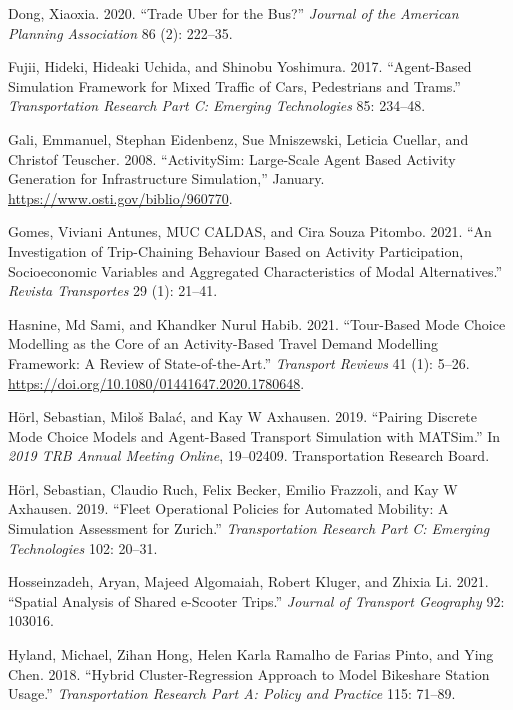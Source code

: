 \documentclass[12pt, oneside, openright]{byuthesis}
\newlength{\cslhangindent}
\newlength{\cslentryspacingunit} %
\newenvironment{CSLReferences}[2] %
 {%
  \setlength{\parindent}{0pt}
  \ifodd #1
  \let\oldpar\par
  \def\par{\hangindent=\cslhangindent\oldpar}
  \fi
  \setlength{\parskip}{#2\cslentryspacingunit}
 }%
 {}
\begin{document}
\begin{CSLReferences}{1}{0}
\leavevmode{}%
Dong, Xiaoxia. 2020. {``Trade Uber for the Bus?''} \emph{Journal of the American Planning Association} 86 (2): 222--35.

\leavevmode{}%
Fujii, Hideki, Hideaki Uchida, and Shinobu Yoshimura. 2017. {``Agent-Based Simulation Framework for Mixed Traffic of Cars, Pedestrians and Trams.''} \emph{Transportation Research Part C: Emerging Technologies} 85: 234--48.

\leavevmode{}%
Gali, Emmanuel, Stephan Eidenbenz, Sue Mniszewski, Leticia Cuellar, and Christof Teuscher. 2008. {``ActivitySim: Large-Scale Agent Based Activity Generation for Infrastructure Simulation,''} January. \url{https://www.osti.gov/biblio/960770}.

\leavevmode{}%
Gomes, Viviani Antunes, MUC CALDAS, and Cira Souza Pitombo. 2021. {``An Investigation of Trip-Chaining Behaviour Based on Activity Participation, Socioeconomic Variables and Aggregated Characteristics of Modal Alternatives.''} \emph{Revista Transportes} 29 (1): 21--41.

\leavevmode{}%
Hasnine, Md Sami, and Khandker Nurul Habib. 2021. {``Tour-Based Mode Choice Modelling as the Core of an Activity-Based Travel Demand Modelling Framework: A Review of State-of-the-Art.''} \emph{Transport Reviews} 41 (1): 5--26. \url{https://doi.org/10.1080/01441647.2020.1780648}.

\leavevmode{}%
Hörl, Sebastian, Miloš Balać, and Kay W Axhausen. 2019. {``Pairing Discrete Mode Choice Models and Agent-Based Transport Simulation with MATSim.''} In \emph{2019 TRB Annual Meeting Online}, 19--02409. Transportation Research Board.

\leavevmode{}%
Hörl, Sebastian, Claudio Ruch, Felix Becker, Emilio Frazzoli, and Kay W Axhausen. 2019. {``Fleet Operational Policies for Automated Mobility: A Simulation Assessment for Zurich.''} \emph{Transportation Research Part C: Emerging Technologies} 102: 20--31.

\leavevmode{}%
Hosseinzadeh, Aryan, Majeed Algomaiah, Robert Kluger, and Zhixia Li. 2021. {``Spatial Analysis of Shared e-Scooter Trips.''} \emph{Journal of Transport Geography} 92: 103016.

\leavevmode{}%
Hyland, Michael, Zihan Hong, Helen Karla Ramalho de Farias Pinto, and Ying Chen. 2018. {``Hybrid Cluster-Regression Approach to Model Bikeshare Station Usage.''} \emph{Transportation Research Part A: Policy and Practice} 115: 71--89.


\end{CSLReferences}
\end{document}
